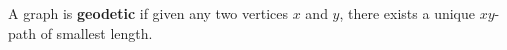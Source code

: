 A graph is \textbf{geodetic} if given any two vertices $x$ and $y$, there exists a unique $xy$-path of smallest length.
